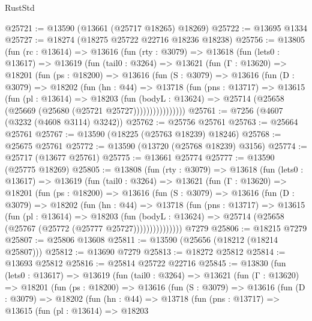 \begin{lexlean}{RustStd}
\begin{coremodule}
@25721 := @13590 (@13661 (@25717 @18265) @18269)
@25722 := @13695 @1334
@25727 := @18274 (@18275 @25722 @22716 @18236 @18238)
@25756 := @13805
    (fun (rc : @13614) =>
    @13616
      (fun (rty : @3079) =>
      @13618
        (fun (lets0 : @13617) =>
        @13619
          (fun (tail0 : @3264) =>
          @13621
            (fun (Γ : @13620) =>
            @18201
              (fun (ps : @18200) =>
              @13616
                (fun (S : @3079) =>
                @13616
                  (fun (D : @3079) =>
                  @18202
                    (fun (hn : @44) =>
                    @13718
                      (fun (pns : @13717) =>
                      @13615
                        (fun (pl : @13614) =>
                        @18203
                          (fun (bodyL : @13624) =>
                          @25714 (@25658 (@25669 (@25680 (@25721 @25727))))))))))))))))
@25761 := @7256 (@4607 (@3232 (@4608 @3114) @3242))
@25762 := @25756 @25761
@25763 := @25664 @25761
@25767 := @13590 (@18225 (@25763 @18239) @18246)
@25768 := @25675 @25761
@25772 := @13590 (@13720 (@25768 @18239) @3156)
@25774 := @25717 (@13677 @25761)
@25775 := @13661 @25774
@25777 := @13590 (@25775 @18269)
@25805 := @13808
    (fun (rty : @3079) =>
    @13618
      (fun (lets0 : @13617) =>
      @13619
        (fun (tail0 : @3264) =>
        @13621
          (fun (Γ : @13620) =>
          @18201
            (fun (ps : @18200) =>
            @13616
              (fun (S : @3079) =>
              @13616
                (fun (D : @3079) =>
                @18202
                  (fun (hn : @44) =>
                  @13718
                    (fun (pns : @13717) =>
                    @13615
                      (fun (pl : @13614) =>
                      @18203
                        (fun (bodyL : @13624) =>
                        @25714 (@25658 (@25767 (@25772 (@25777 @25727)))))))))))))))
    @7279
@25806 := @18215 @7279
@25807 := @25806 @13608
@25811 := @13590 (@25656 (@18212 (@18214 @25807)))
@25812 := @13690 @7279
@25813 := @18272 @25812
@25814 := @13693 @25812
@25816 := @25814 @25722 @22716
@25845 := @13830
    (fun (lets0 : @13617) =>
    @13619
      (fun (tail0 : @3264) =>
      @13621
        (fun (Γ : @13620) =>
        @18201
          (fun (ps : @18200) =>
          @13616
            (fun (S : @3079) =>
            @13616
              (fun (D : @3079) =>
              @18202
                (fun (hn : @44) =>
                @13718
                  (fun (pns : @13717) =>
                  @13615
                    (fun (pl : @13614) =>
                    @18203

\end{coremodule}
\end{lexlean}
